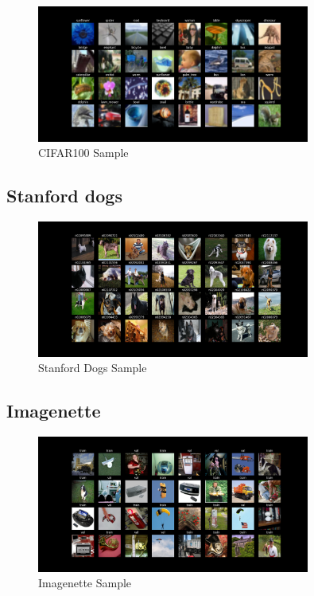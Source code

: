 \begin{figure}[h]
    \centering
    \includegraphics[width=0.8\textwidth]{images/cifar100.png}
	\caption{CIFAR100 Sample}
    \label{fig:cifar100}
\end{figure}

\subsection{Stanford dogs}
\begin{figure}[h]
    \centering
    \includegraphics[width=0.8\textwidth]{images/dogs.png}
	\caption{Stanford Dogs Sample}
	\label{fig:dogs}
\end{figure}



\subsection{Imagenette}

\begin{figure}[h]
	\centering
	\includegraphics[width=0.8\textwidth]{images/imagenette.png}
	\caption{Imagenette Sample}
	\label{fig:imagenette}
\end{figure}


